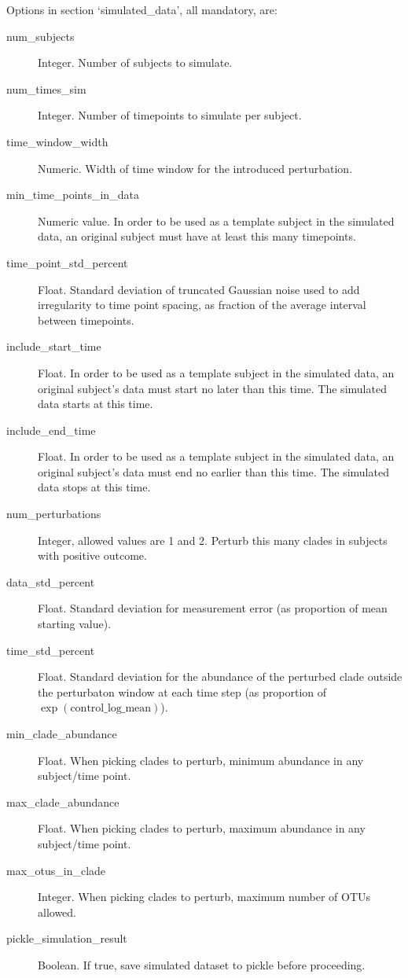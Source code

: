 \documentclass[12pt]{report}
\begin{document}
Options in section `simulated\_data', all mandatory, are:

\begin{description}
\item[num\_subjects] Integer. Number of subjects to simulate.
\item[num\_times\_sim ] Integer. Number of timepoints to simulate per subject.
\item[time\_window\_width ] Numeric. Width of time window for the
  introduced perturbation.
\item[min\_time\_points\_in\_data] Numeric value. In order to be used as a template subject in the simulated data, an original subject must have at least this many timepoints.
\item[time\_point\_std\_percent ] Float. Standard deviation of
  truncated Gaussian noise used to add irregularity to time point
  spacing, as fraction of the average interval between timepoints.
\item[include\_start\_time] Float. In order to be used as a template subject in the simulated data, an original subject's data must start no later than this time. The simulated data starts at this time.
\item[include\_end\_time ] Float. In order to be used as a template subject in the simulated data, an original subject's data must end no earlier than this time. The simulated data stops at this time.
\item[num\_perturbations] Integer, allowed values are 1 and 2. Perturb
  this many clades in subjects with positive outcome.
\item[data\_std\_percent] Float. Standard deviation for measurement error (as proportion of mean starting value).
\item[time\_std\_percent] Float. Standard deviation for the abundance of the perturbed clade outside the perturbaton window at each time step (as proportion of $\exp(\text{control\_log\_mean})$).
\item[min\_clade\_abundance] Float. When picking clades to perturb,
  minimum abundance in any subject/time point.
\item[max\_clade\_abundance ] Float. When picking clades to perturb,
  maximum abundance in any subject/time point.
\item[max\_otus\_in\_clade ] Integer. When picking clades to perturb,
  maximum number of OTUs allowed.
\item[pickle\_simulation\_result] Boolean. If true, save simulated
  dataset to pickle before proceeding.

\end{description}
\end{document}
